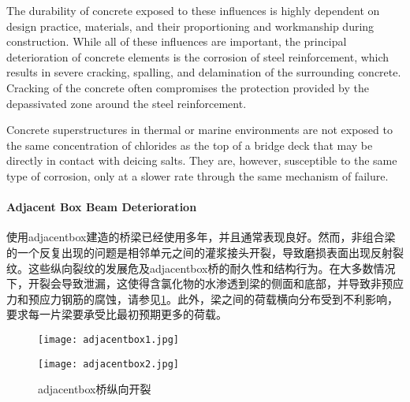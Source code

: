 The durability of concrete exposed to these influences is highly dependent on design practice, materials, and their proportioning and workmanship during construction. While all of these influences are important, the principal deterioration of concrete elements is the corrosion of steel reinforcement, which results in severe cracking, spalling, and delamination of the surrounding concrete. Cracking of the concrete often compromises the protection provided by the depassivated zone around the steel reinforcement.

Concrete superstructures in thermal or marine environments are not exposed to the same concentration of chlorides as the top of a bridge deck that may be directly in contact with deicing salts. They are, however, susceptible to the same type of corrosion, only at a slower rate through the same mechanism of failure.

\paragraph{Adjacent Box Beam Deterioration}
\label{par:adjacent-box-deterioration}
使用\gls*{adjacentbox}建造的桥梁已经使用多年，并且通常表现良好。然而，非组合梁的一个反复出现的问题是相邻单元之间的灌浆接头开裂，导致磨损表面出现反射裂纹。这些纵向裂纹的发展危及\gls*{adjacentbox}桥的耐久性和结构行为。在大多数情况下，开裂会导致泄漏，这使得含氯化物的水渗透到梁的侧面和底部，并导致非预应力和预应力钢筋的腐蚀，请参见\cref{fig:longitudinal-cracking-adjacent-box-beam}。此外，梁之间的荷载横向分布受到不利影响，要求每一片梁要承受比最初预期更多的荷载。

\begin{figure}
  \begin{minipage}{0.5\linewidth}\centering
    \texttt{[image: adjacentbox1.jpg]}
  \end{minipage}%
  \begin{minipage}{0.5\linewidth}\centering
    \texttt{[image: adjacentbox2.jpg]}
  \end{minipage}
  \caption{\gls*{adjacentbox}桥纵向开裂}
  \label{fig:longitudinal-cracking-adjacent-box-beam}
\end{figure}

